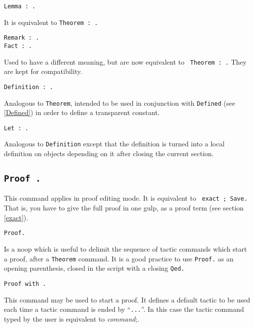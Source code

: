\begin{Variants}

\item {\tt Lemma {\ident} : {\form}.}

  It is equivalent to {\tt Theorem {\ident} : {\form}.}

\item {\tt Remark {\ident} : {\form}.}\\
  {\tt Fact {\ident} : {\form}.}

  Used to have a different meaning, but are now equivalent to {\tt
  Theorem {\ident} : {\form}.} They are kept for compatibility.

\item {\tt Definition {\ident} : {\form}.}

  Analogous to {\tt Theorem}, intended to be used in conjunction with
  {\tt Defined} (see \ref{Defined}) in order to define a
  transparent constant.

\item {\tt Let {\ident} : {\form}.}

  Analogous to {\tt Definition} except that the definition is turned
  into a local definition on objects depending on it after closing the
  current section.
\end{Variants}

\subsection{\tt Proof {\term}.}
This command applies in proof editing mode. It is equivalent to {\tt
  exact {\term}; Save.} That is, you have to give the full proof in
one gulp, as a proof term (see section \ref{exact}).

\begin{Variants}

\item{\tt Proof.}
  
  Is a noop which is useful to delimit the sequence of tactic commands
  which start a proof, after a {\tt Theorem} command.  It is a good
  practice to use {\tt Proof.} as an opening parenthesis, closed in
  the script with a closing {\tt Qed.}

\item{\tt Proof with {\tac}.}
  
  This command may be used to start a proof. It defines a default
  tactic to be used each time a tactic command is ended by
  ``\verb#...#''. In this case the tactic command typed by the user is
  equivalent to \emph{command};{\tac}.

\end{Variants}

